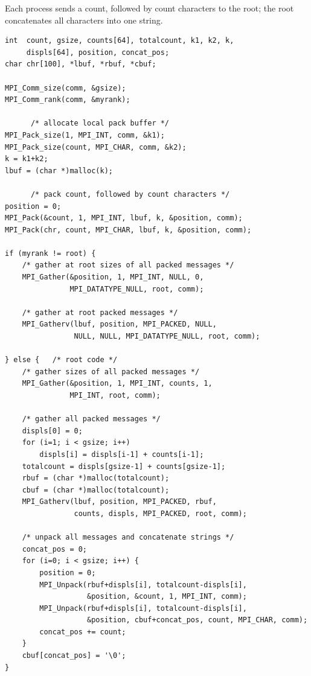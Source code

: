 \begin{example}
\label{pt2pt-exLL}
%
%
Each process sends a count, followed by count characters to the root;
the root
concatenates
all characters into one string.
\begin{lstlisting}[language={[MPI]C}]
int  count, gsize, counts[64], totalcount, k1, k2, k,
     displs[64], position, concat_pos;
char chr[100], *lbuf, *rbuf, *cbuf;

MPI_Comm_size(comm, &gsize);
MPI_Comm_rank(comm, &myrank);

      /* allocate local pack buffer */
MPI_Pack_size(1, MPI_INT, comm, &k1);
MPI_Pack_size(count, MPI_CHAR, comm, &k2);
k = k1+k2;
lbuf = (char *)malloc(k);

      /* pack count, followed by count characters */
position = 0;
MPI_Pack(&count, 1, MPI_INT, lbuf, k, &position, comm);
MPI_Pack(chr, count, MPI_CHAR, lbuf, k, &position, comm);

if (myrank != root) {
    /* gather at root sizes of all packed messages */
    MPI_Gather(&position, 1, MPI_INT, NULL, 0,
               MPI_DATATYPE_NULL, root, comm);

    /* gather at root packed messages */
    MPI_Gatherv(lbuf, position, MPI_PACKED, NULL,
                NULL, NULL, MPI_DATATYPE_NULL, root, comm);

} else {   /* root code */
    /* gather sizes of all packed messages */
    MPI_Gather(&position, 1, MPI_INT, counts, 1,
               MPI_INT, root, comm);

    /* gather all packed messages */
    displs[0] = 0;
    for (i=1; i < gsize; i++)
        displs[i] = displs[i-1] + counts[i-1];
    totalcount = displs[gsize-1] + counts[gsize-1];
    rbuf = (char *)malloc(totalcount);
    cbuf = (char *)malloc(totalcount);
    MPI_Gatherv(lbuf, position, MPI_PACKED, rbuf,
                counts, displs, MPI_PACKED, root, comm);

    /* unpack all messages and concatenate strings */
    concat_pos = 0;
    for (i=0; i < gsize; i++) {
        position = 0;
        MPI_Unpack(rbuf+displs[i], totalcount-displs[i],
                   &position, &count, 1, MPI_INT, comm);
        MPI_Unpack(rbuf+displs[i], totalcount-displs[i],
                   &position, cbuf+concat_pos, count, MPI_CHAR, comm);
        concat_pos += count;
    }
    cbuf[concat_pos] = '\0';
}
\end{lstlisting}
\end{example}


